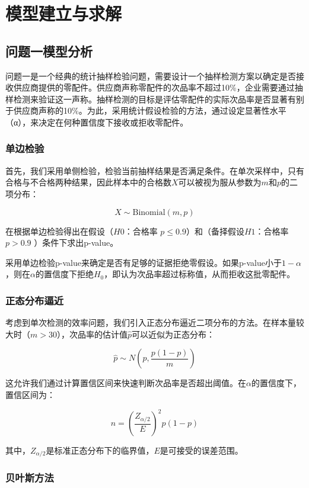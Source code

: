 \documentclass[withoutpreface,bwprint]{cumcmthesis}
\begin{document}
\section{模型建立与求解}
\subsection{问题一模型分析}
问题一是一个经典的统计抽样检验问题，需要设计一个抽样检测方案以确定是否接收供应商提供的零配件。供应商声称零配件的次品率不超过10\%，企业需要通过抽样检测来验证这一声称。抽样检测的目标是评估零配件的实际次品率是否显著有别于供应商声称的10\%。为此，采用统计假设检验的方法，通过设定显著性水平（α），来决定在何种置信度下接收或拒收零配件。

\subsubsection{单边检验}

首先，我们采用单侧检验，检验当前抽样结果是否满足条件。在单次采样中，只有合格与不合格两种结果，因此样本中的合格数\(X\)可以被视为服从参数为\(m\)和\(p\)的二项分布：

$$X \sim \text{Binomial}(m, p)$$

在根据单边检验得出在假设（$H0$：合格率 $p\leq0.9$）和（备择假设$H1$​：合格率 $p>0.9$ ）条件下求出p-value。

采用单边检验p-value来确定是否有足够的证据拒绝零假设。如果p-value小于$1-\alpha$，则在$\alpha$的置信度下拒绝$H_0$，即认为次品率超过标称值，从而拒收这批零配件。

\subsubsection{正态分布逼近}

考虑到单次检测的效率问题，我们引入正态分布逼近二项分布的方法。在样本量较大时（$m > 30$），次品率的估计值$\hat{p}$可以近似为正态分布：

$$\hat{p} \sim N(p, \frac{p(1-p)}{m})$$

这允许我们通过计算置信区间来快速判断次品率是否超出阈值。在$\alpha$的置信度下，置信区间为：

$$n = \left(\frac{Z_{\alpha/2}}{E}\right)^2 p(1-p)$$

其中，$Z_{\alpha/2}$是标准正态分布下的临界值，$E$是可接受的误差范围。

\subsubsection{贝叶斯方法}
\end{document}
